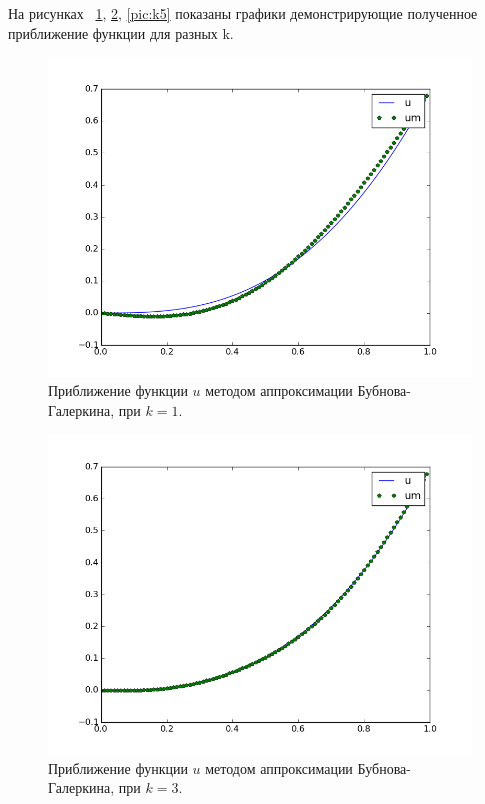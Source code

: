 \documentclass[12pt,a4paper,oneside]{extarticle}
\begin{document}
    На рисунках ~\ref{pic:k1}, \ref{pic:k3}, \ref{pic:k5} показаны графики демонстрирующие полученное приближение функции для разных k.
    \begin{figure}[ht!]
        \centering
        \includegraphics[scale=0.8]{k1.png}
        \caption{Приближение функции $u$ методом аппроксимации Бубнова-Галеркина, при $k = 1$.}
        \label{pic:k1}
    \end{figure}

    \begin{figure}[ht!]
        \centering
        \includegraphics[scale=0.8]{k3.png}
        \caption{Приближение функции $u$ методом аппроксимации Бубнова-Галеркина, при $k = 3$.}
        \label{pic:k3}
    \end{figure}
\end{document}
